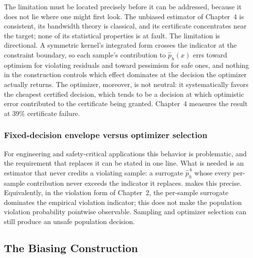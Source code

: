 The limitation must be located precisely before it can be addressed,
because it does not lie where one might first look. The unbiased
estimator of Chapter~4 is consistent, its bandwidth theory is classical,
and its certificate concentrates near the target; none of its
statistical properties is at fault. The limitation is directional. A symmetric kernel's
integrated form crosses the indicator at the constraint boundary, so
each sample's contribution to $\hat{p}_h(x)$ errs toward optimism for
violating residuals and toward pessimism for safe ones, and nothing in
the construction controls which effect dominates at the decision the
optimizer actually returns. The optimizer, moreover, is not neutral:
it systematically favors the cheapest certified decision, which
tends to be a decision at which optimistic error contributed to the
certificate being granted. Chapter~4 measures the result at
$39\%$ certificate failure.

\subsubsection{Fixed-decision envelope versus optimizer selection}
\label{sec:fixeddecisionenvelope}

For engineering and safety-critical applications this behavior is
problematic, and the requirement that replaces it can be stated in one
line. What is needed is an estimator that never credits a violating
sample: a surrogate $\hat{p}_h^{\,b}$ whose every per-sample contribution
never exceeds the indicator it replaces.  makes this
precise. Equivalently, in the violation
form of Chapter~2, the per-sample surrogate dominates the empirical
violation indicator; this does not make the population violation probability
pointwise observable. Sampling and optimizer selection can still produce an
unsafe population decision.

\subsection{The Biasing Construction}
\label{sec:biasing}

